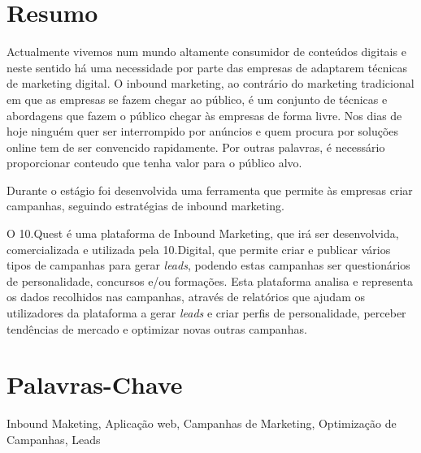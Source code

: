 \section*{Resumo}
\label{sec:resumo}

Actualmente vivemos num mundo altamente consumidor de conteúdos digitais e neste sentido há uma necessidade por parte das empresas de adaptarem técnicas de marketing digital. O inbound marketing, ao contrário do marketing tradicional em que as empresas se fazem chegar ao público, é um conjunto de técnicas e abordagens que fazem o público chegar às empresas de forma livre. Nos dias de hoje ninguém quer ser interrompido por anúncios e quem procura por soluções online tem de ser convencido rapidamente. Por outras palavras, é necessário proporcionar conteudo que tenha valor para o público alvo.

Durante o estágio foi desenvolvida uma ferramenta que permite às empresas criar campanhas, seguindo estratégias de inbound marketing. 

O 10.Quest é uma plataforma de Inbound Marketing, que irá ser desenvolvida, comercializada e utilizada pela 10.Digital, que permite criar e publicar vários tipos de campanhas para gerar \textit{leads}, podendo estas campanhas ser questionários de personalidade, concursos e/ou formações. Esta plataforma analisa e representa os dados recolhidos nas campanhas, através de relatórios que ajudam os utilizadores da plataforma a gerar \textit{leads} e criar perfis de personalidade, perceber tendências de mercado e optimizar novas outras campanhas.



\section*{Palavras-Chave}
\label{sec:palavras}

Inbound Maketing, Aplicação web, Campanhas de Marketing, Optimização de Campanhas, Leads 

